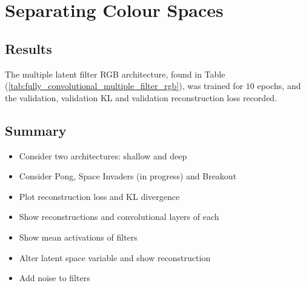 \clearpage
%
%
%
%
%
\section{Separating Colour Spaces}

\subsection{Results}
The multiple latent filter RGB architecture, found in Table (\ref{tab:fully_convolutional_multiple_filter_rgb}), was trained for $10$ epochs, and the validation, validation KL and validation reconstruction loss recorded.



\subsection{Summary}

\begin{itemize}
\item Consider two architectures: shallow and deep
\item Consider Pong, Space Invaders (in progress) and Breakout
\item Plot reconstruction loss and KL divergence
\item Show reconstructions and convolutional layers of each
\item Show mean activations of filters
\item Alter latent space variable and show reconstruction
\item Add noise to filters
\end{itemize}




